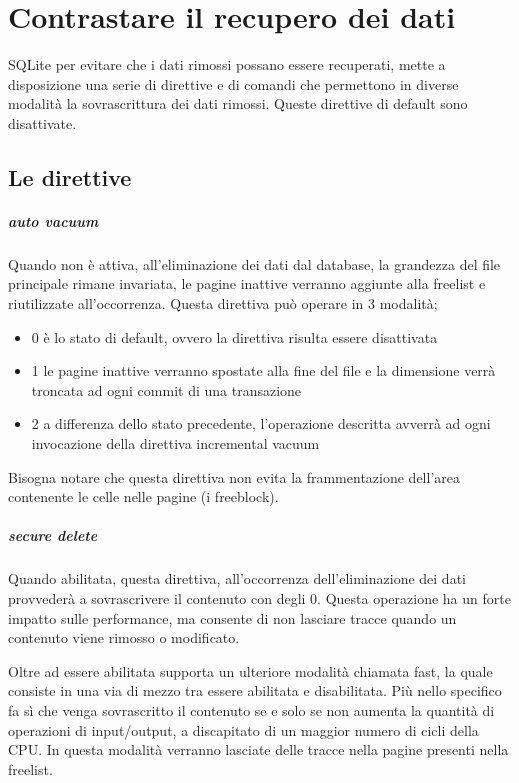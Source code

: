 
\chapter{Contrastare il recupero dei dati}
SQLite per evitare che i dati rimossi possano essere recuperati, mette a disposizione una serie di direttive e di comandi che permettono in diverse modalità la sovrascrittura dei dati rimossi. Queste direttive di default sono disattivate. 
 	
\section{Le direttive}
\paragraph{auto vacuum}
Quando non è attiva, all'eliminazione dei dati dal database, la grandezza del file principale rimane invariata, le pagine inattive verranno aggiunte alla freelist e riutilizzate all'occorrenza.
Questa direttiva può operare in 3 modalità;

\begin{itemize}
\item 0 è lo stato di default, ovvero la direttiva risulta essere disattivata
\item 1 le pagine inattive verranno spostate alla fine del file e la dimensione verrà troncata ad ogni commit di una transazione
\item 2 a differenza dello stato precedente, l'operazione descritta avverrà ad ogni invocazione della direttiva incremental vacuum
\end{itemize}


Bisogna notare che questa direttiva non evita la frammentazione dell'area contenente le celle nelle pagine (i freeblock).

\paragraph{secure delete}
Quando abilitata, questa direttiva, all'occorrenza dell'eliminazione dei dati provvederà a sovrascrivere il contenuto con degli 0. Questa operazione ha un forte impatto sulle performance, ma consente di non lasciare tracce quando un contenuto viene rimosso o modificato.

Oltre ad essere abilitata supporta un ulteriore modalità chiamata fast, la quale consiste in una via di mezzo tra essere abilitata e disabilitata. Più nello specifico fa sì che venga sovrascritto il contenuto se e solo se non aumenta la quantità di operazioni di input/output, a discapitato di un maggior numero di cicli della CPU. In questa modalità verranno lasciate delle tracce nella pagine presenti nella freelist.

